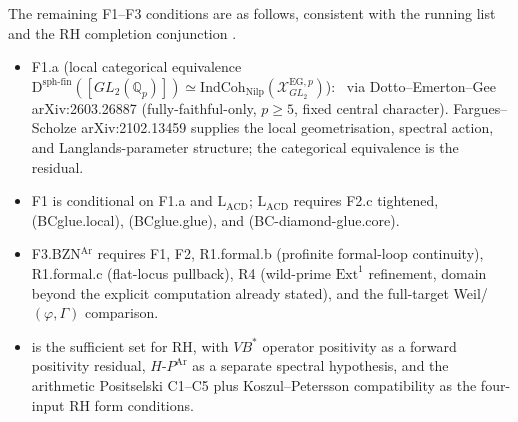 The remaining F1--F3 conditions are as follows,
consistent with the running list 
and the RH completion conjunction .

\begin{itemize}
\item F1.a (local categorical equivalence
\(\mathrm{D}^{\mathrm{sph\text{-}fin}}([GL_2(\mathbb{Q}_p)])
\simeq
\mathrm{IndCoh}_{\mathrm{Nilp}}(\mathcal{X}^{\mathrm{EG},p}_{GL_2})\)):
\ClaimStatusNeedsVerification\ via Dotto--Emerton--Gee
arXiv:2603.26887 (fully-faithful-only, \(p\geq 5\), fixed central
character). Fargues--Scholze arXiv:2102.13459 supplies the local
geometrisation, spectral action, and Langlands-parameter structure;
the categorical equivalence is the residual.

\item F1 is conditional on F1.a and \(\mathrm{L}_{\mathrm{ACD}}\);
\(\mathrm{L}_{\mathrm{ACD}}\) requires F2.c tightened,
(BCglue.local), (BCglue.glue), and (BC-diamond-glue.core).

\item F3.BZN\({}^{\mathrm{Ar}}\) requires F1, F2, R1.formal.b
(profinite formal-loop continuity),
R1.formal.c (flat-locus pullback),
R4 (wild-prime \(\mathrm{Ext}^1\) refinement, domain beyond
the explicit computation already stated), and the
full-target Weil/\((\varphi,\Gamma)\) comparison.

\item {} is the sufficient set
for RH, with \(VB^*\) operator positivity as a forward positivity
residual, \(H\text{-}P^{\mathrm{Ar}}\) as a separate spectral
hypothesis, and the arithmetic Positselski C1--C5 plus
Koszul--Petersson compatibility as the four-input RH form conditions.
\end{itemize}
